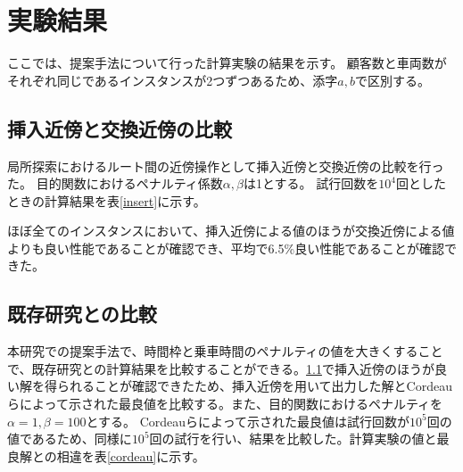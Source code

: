 \section{実験結果}
ここでは、提案手法について行った計算実験の結果を示す。
顧客数と車両数がそれぞれ同じであるインスタンスが2つずつあるため、添字$a,b$で区別する。
\subsection{挿入近傍と交換近傍の比較}
\label{sec:insert}
局所探索におけるルート間の近傍操作として挿入近傍と交換近傍の比較を行った。
目的関数におけるペナルティ係数$\alpha,\beta$は1とする。
試行回数を$10^4$回としたときの計算結果を表\ref{insert}に示す。

ほぼ全てのインスタンスにおいて、挿入近傍による値のほうが交換近傍による値よりも良い性能であることが確認でき、平均で6.5\%良い性能であることが確認できた。

\subsection{既存研究との比較}
本研究での提案手法で、時間枠と乗車時間のペナルティの値を大きくすることで、既存研究との計算結果を比較することができる。\ref{sec:insert}で挿入近傍のほうが良い解を得られることが確認できたため、挿入近傍を用いて出力した解とCordeauらによって示された最良値を比較する。また、目的関数におけるペナルティを$\alpha=1,\beta=100$とする。
Cordeauらによって示された最良値は試行回数が$10^5$回の値であるため、同様に$10^5$回の試行を行い、結果を比較した。計算実験の値と最良解との相違を表\ref{cordeau}に示す。

